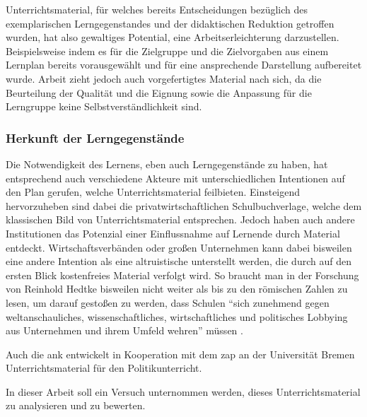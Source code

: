 Unterrichtsmaterial, für welches bereits Entscheidungen bezüglich des exemplarischen Lerngegenstandes und der didaktischen Reduktion getroffen wurden, hat also gewaltiges Potential, eine Arbeitserleichterung darzustellen.
Beispielsweise indem es für die Zielgruppe und die Zielvorgaben aus einem Lernplan bereits vorausgewählt und für eine ansprechende Darstellung aufbereitet wurde.
Arbeit zieht jedoch auch vorgefertigtes Material nach sich, da die Beurteilung der Qualität und die Eignung sowie die Anpassung für die Lerngruppe keine Selbstverständlichkeit sind.

\subsubsection{Herkunft der Lerngegenstände}
Die Notwendigkeit des Lernens, eben auch Lerngegenstände zu haben, hat entsprechend auch verschiedene Akteure mit unterschiedlichen Intentionen auf den Plan gerufen, welche Unterrichtsmaterial feilbieten.
Einsteigend hervorzuheben sind dabei die privatwirtschaftlichen Schulbuchverlage, welche dem klassischen Bild von Unterrichtsmaterial entsprechen. Jedoch haben auch andere Institutionen das Potenzial einer Einflussnahme auf Lernende durch 
Material entdeckt. Wirtschaftsverbänden oder großen Unternehmen kann dabei bisweilen eine andere Intention als eine altruistische unterstellt werden, die durch auf den ersten Blick kostenfreies Material verfolgt wird. So braucht man in der Forschung von Reinhold Hedtke bisweilen nicht weiter als bis zu den römischen Zahlen zu lesen, um darauf gestoßen zu werden, dass Schulen \enquote{sich zunehmend gegen weltanschauliches, wissenschaftliches, wirtschaftliches und politisches Lobbying aus Unternehmen und ihrem Umfeld wehren} müssen \autocite[i]{Hedtke2016}. 


Auch die \gls{ank} entwickelt in Kooperation mit dem \gls{zap} an der Universität Bremen Unterrichtsmaterial für den Politikunterricht.


In dieser Arbeit soll ein Versuch unternommen werden, dieses Unterrichtsmaterial zu analysieren und zu bewerten. %

